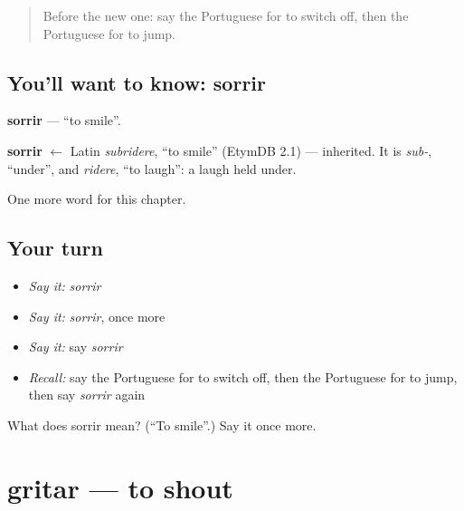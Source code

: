 \label{lesson:PT-C138-sorrir}



\begin{quote}
Before the new one: say the Portuguese for to switch off, then the Portuguese for to jump.
\end{quote}

\subsection*{You'll want to know: sorrir}
\textbf{sorrir} — \textquotedblleft{}to smile\textquotedblright{}.

\begin{cousinweb}
\textbf{sorrir} $\leftarrow$ Latin \emph{subridere}, \textquotedblleft{}to smile\textquotedblright{} (EtymDB 2.1) — inherited. It is \emph{sub-}, \textquotedblleft{}under\textquotedblright{}, and \emph{ridere}, \textquotedblleft{}to laugh\textquotedblright{}: a laugh held under.
\end{cousinweb}

\begin{grammarlens}[title={What you've built}]
One more word for this chapter.
\end{grammarlens}

\subsection*{Your turn}
\begin{itemize}
\raggedright
  \item \emph{Say it:} \emph{sorrir}
  \item \emph{Say it:} \emph{sorrir}, once more
  \item \emph{Say it:} say \emph{sorrir}
  \item \emph{Recall:} say the Portuguese for to switch off, then the Portuguese for to jump, then say \emph{sorrir} again
\end{itemize}

\begin{tcolorbox}[breakable,colback=teal!4,colframe=teal!35!black,title={Before you move on}]
What does sorrir mean? (\textquotedblleft{}To smile\textquotedblright{}.) Say it once more.
\end{tcolorbox}
\section[gritar]{gritar — to shout}

\label{lesson:PT-C138-gritar}




